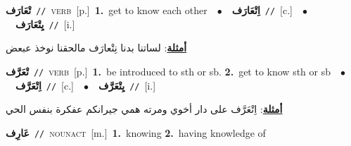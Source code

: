 \documentclass[10pt,a4paper,twoside]{article} %
\begin{document}
\begin{multicols}{2}
{\setlength\topsep{0pt}\textbf{\foreignlanguage{arabic}{تْعَارَف}}\ {\color{gray}\texttt{//}\color{black}}\ \textsc{verb}\ [p.]\ \textbf{1.}~get to know each other\ \ $\bullet$\ \ \setlength\topsep{0pt}\textbf{\foreignlanguage{arabic}{اِتْعَارَف}}\ {\color{gray}\texttt{//}\color{black}}\ [c.]\ \ $\bullet$\ \ \setlength\topsep{0pt}\textbf{\foreignlanguage{arabic}{يِتْعَارَف}}\ {\color{gray}\texttt{//}\color{black}}\ [i.]\  \begin{flushright}\color{gray}\foreignlanguage{arabic}{\textbf{\underline{\foreignlanguage{arabic}{أمثلة}}}: لساتنا بدنا نِتْعارَف مالحقنا نوخذ عبعض}\end{flushright}\color{black}} \vspace{2mm}

{\setlength\topsep{0pt}\textbf{\foreignlanguage{arabic}{تْعَرَّف}}\ {\color{gray}\texttt{//}\color{black}}\ \textsc{verb}\ [p.]\ \textbf{1.}~be introduced to sth or sb.  \textbf{2.}~get to know sth or sb\ \ $\bullet$\ \ \setlength\topsep{0pt}\textbf{\foreignlanguage{arabic}{اِتْعَرَّف}}\ {\color{gray}\texttt{//}\color{black}}\ [c.]\ \ $\bullet$\ \ \setlength\topsep{0pt}\textbf{\foreignlanguage{arabic}{يِتْعَرَّف}}\ {\color{gray}\texttt{//}\color{black}}\ [i.]\  \begin{flushright}\color{gray}\foreignlanguage{arabic}{\textbf{\underline{\foreignlanguage{arabic}{أمثلة}}}: اِتْعَرَّف على دار أخوي ومرته همي جيرانكم عفكرة بنفس الحي}\end{flushright}\color{black}} \vspace{2mm}

{\setlength\topsep{0pt}\textbf{\foreignlanguage{arabic}{عَارِف}}\ {\color{gray}\texttt{//}\color{black}}\ \textsc{noun\textunderscore act}\ [m.]\ \textbf{1.}~knowing  \textbf{2.}~having knowledge of\ } \vspace{2mm}


\end{multicols}
\end{document}

